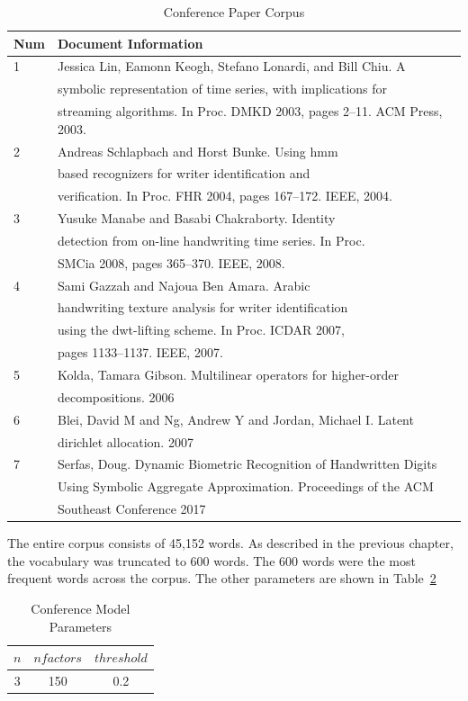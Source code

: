 \documentclass[../ut-dissertation.tex]{subfiles}
\begin{document}
\begin{table}[p]
  \centering
  \caption{Conference Paper Corpus}\label{tab:conference_corpus}
  \begin{tabular}{|l|l|}
    \hline
    Num & Document Information\\
    \hline
    1 & Jessica Lin, Eamonn Keogh, Stefano Lonardi, and Bill Chiu. A\\
      & symbolic representation of time series, with implications for\\
      & streaming algorithms. In Proc. DMKD 2003, pages 2–11. ACM
        Press, 2003.\\
    \hline
    2 & Andreas Schlapbach and Horst Bunke. Using hmm\\
      & based recognizers for writer identification and\\
      & verification. In Proc. FHR 2004, pages 167–172. IEEE, 2004.\\
    \hline
    3 & Yusuke Manabe and Basabi Chakraborty. Identity\\
      & detection from on-line handwriting time series. In Proc.\\
      & SMCia 2008, pages 365–370. IEEE, 2008.\\
    \hline
    4 & Sami Gazzah and Najoua Ben Amara. Arabic \\
      & handwriting texture analysis for writer identification\\
      & using the dwt-lifting scheme. In Proc. ICDAR 2007,\\
      & pages 1133–1137. IEEE, 2007.\\
    \hline
    5 & Kolda, Tamara Gibson. Multilinear operators for higher-order \\
      & decompositions. 2006\\
    \hline
    6 & Blei, David M and Ng, Andrew Y and Jordan, Michael I. Latent\\
      & dirichlet allocation. 2007\\
    \hline
    7 & Serfas, Doug. Dynamic Biometric Recognition of Handwritten Digits\\
      & Using Symbolic Aggregate Approximation. Proceedings of the ACM\\
      & Southeast Conference 2017\\
    \hline
  \end{tabular}
\end{table}

The entire corpus consists of 45,152 words.  As described in the
previous chapter, the vocabulary was truncated to 600 words.  The 600
words were the most frequent words across the corpus.  The other
parameters are shown in Table~\ref{tab:model_parameters}
\begin{table}[p]
  \centering
  \caption{Conference Model Parameters}\label{tab:model_parameters}
  \begin{tabular}{ccc}
    \hline
    $n$ & $nfactors$ & $threshold$\\
    \hline
    3 & 150 & 0.2\\
    \hline
  \end{tabular}
\end{table}
\end{document}
